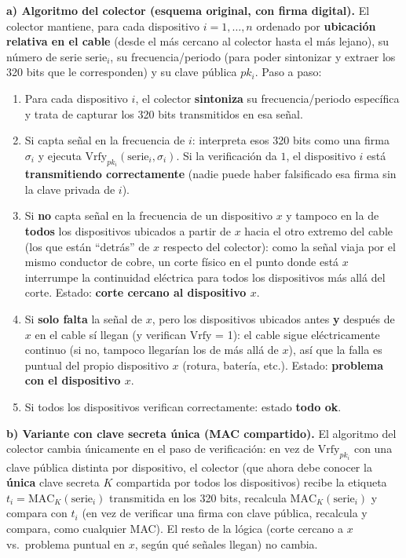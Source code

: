 \textbf{a) Algoritmo del colector (esquema original, con firma digital).} El colector
mantiene, para cada dispositivo $i=1,\dots,n$ ordenado por \textbf{ubicación relativa en el
cable} (desde el más cercano al colector hasta el más lejano), su número de serie
$\text{serie}_i$, su frecuencia/periodo (para poder sintonizar y extraer los 320 bits que
le corresponden) y su clave pública $pk_i$. Paso a paso:
\begin{enumerate}
  \item Para cada dispositivo $i$, el colector \textbf{sintoniza} su frecuencia/periodo
  específica y trata de capturar los 320 bits transmitidos en esa señal.
  \item Si capta señal en la frecuencia de $i$: interpreta esos 320 bits como una firma
  $\sigma_i$ y ejecuta $\mathrm{Vrfy}_{pk_i}(\text{serie}_i,\sigma_i)$. Si la verificación
  da $1$, el dispositivo $i$ está \textbf{transmitiendo correctamente} (nadie puede haber
  falsificado esa firma sin la clave privada de $i$).
  \item Si \textbf{no} capta señal en la frecuencia de un dispositivo $x$ y tampoco en la
  de \textbf{todos} los dispositivos ubicados a partir de $x$ hacia el otro extremo del
  cable (los que están ``detrás'' de $x$ respecto del colector): como la señal viaja por
  el mismo conductor de cobre, un corte físico en el punto donde está $x$ interrumpe la
  continuidad eléctrica para todos los dispositivos más allá del corte. Estado:
  \textbf{corte cercano al dispositivo $x$}.
  \item Si \textbf{solo falta} la señal de $x$, pero los dispositivos ubicados antes
  \textbf{y} después de $x$ en el cable sí llegan (y verifican $\mathrm{Vrfy}$ = 1): el
  cable sigue eléctricamente continuo (si no, tampoco llegarían los de más allá de $x$),
  así que la falla es puntual del propio dispositivo $x$ (rotura, batería, etc.). Estado:
  \textbf{problema con el dispositivo $x$}.
  \item Si todos los dispositivos verifican correctamente: estado \textbf{todo ok}.
\end{enumerate}

\textbf{b) Variante con clave secreta única (MAC compartido).} El algoritmo del colector
cambia únicamente en el paso de verificación: en vez de $\mathrm{Vrfy}_{pk_i}$ con una
clave pública distinta por dispositivo, el colector (que ahora debe conocer la
\textbf{única} clave secreta $K$ compartida por todos los dispositivos) recibe la etiqueta
$t_i=\mathrm{MAC}_K(\text{serie}_i)$ transmitida en los 320 bits, recalcula
$\mathrm{MAC}_K(\text{serie}_i)$ y compara con $t_i$ (en vez de verificar una firma con
clave pública, recalcula y compara, como cualquier MAC). El resto de la lógica (corte
cercano a $x$ vs.\ problema puntual en $x$, según qué señales llegan) no cambia.

